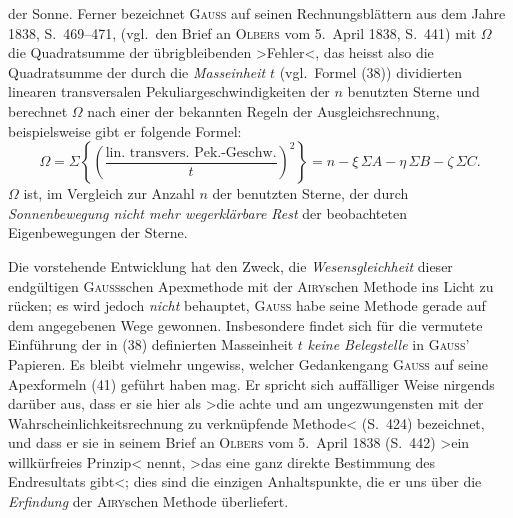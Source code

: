 \documentclass[12pt,a4paper]{article}
\theoremstyle{plain}
\theoremstyle{definition}
\theoremstyle{remark}
\begin{document}
\begin{small}
der Sonne. Ferner bezeichnet \textsc{Gauss} auf seinen Rechnungsbl\"attern aus dem
Jahre 1838, S.~469--471, (vgl.~den Brief an \textsc{Olbers} vom 5.~April 1838, S.~441)
mit $\Omega$ die Quadratsumme der \"ubrigbleibenden \textgreater{}Fehler\textless{}, das heisst also die
Quadratsumme der durch die \textit{Masseinheit} $t$ (vgl.~Formel (38)) dividierten linearen
transversalen Pekuliargeschwindigkeiten der $n$ benutzten Sterne und berechnet
$\Omega$ nach einer der bekannten Regeln der Ausgleichsrechnung, beispielsweise gibt
er folgende Formel:
\begin{equation}\tag{42}
\Omega = \Sigma\left\{\left(\frac{\text{lin.~transvers.~Pek.-Geschw.}}{t}\right)^{2}\right\}
= n - \xi\,\Sigma A - \eta\,\Sigma B - \zeta\,\Sigma C.
\end{equation}
$\Omega$ ist, im Vergleich zur Anzahl $n$ der benutzten Sterne, der durch
\textit{Sonnenbewegung nicht mehr wegerkl\"arbare Rest} der beobachteten Eigenbewegungen
der Sterne.

Die vorstehende Entwicklung hat den Zweck, die \textit{Wesensgleichheit} dieser
endg\"ultigen \textsc{Gauss}schen Apexmethode mit der \textsc{Airy}schen Methode ins
Licht zu r\"ucken; es wird jedoch \textit{nicht} behauptet, \textsc{Gauss} habe seine Methode
gerade auf dem angegebenen Wege gewonnen. Insbesondere findet sich f\"ur die
vermutete Einf\"uhrung der in (38) definierten Masseinheit $t$ \textit{keine Belegstelle}
in \textsc{Gauss'} Papieren. Es bleibt vielmehr ungewiss, welcher Gedankengang
\textsc{Gauss} auf seine Apexformeln (41) gef\"uhrt haben mag. Er spricht sich
auff\"alliger Weise nirgends dar\"uber aus, dass er sie hier als \textgreater{}die \textquotedbl achte und
am ungezwungensten mit der Wahrscheinlichkeitsrechnung zu verkn\"upfende Methode\textless{}
(S.~424) bezeichnet, und dass er sie in seinem Brief an \textsc{Olbers} vom 5.~April
1838 (S.~442) \textgreater{}ein willk\"urfreies Prinzip\textless{} nennt, \textgreater{}das eine ganz direkte
Bestimmung des Endresultats gibt\textless{}; dies sind die einzigen Anhaltspunkte, die
er uns \"uber die \textit{Erfindung} der \textsc{Airy}schen Methode \"uberliefert.
\end{small}
\end{document}

